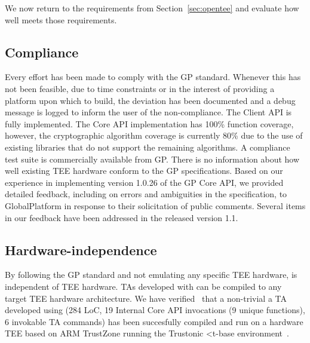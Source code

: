 \documentclass[10pt,conference,letterpaper]{IEEEtran}
\newcommand{\opentee}{\protect{TEE-Vi}\xspace}
\newcommand{\opentee}{\protect{Open-TEE}\xspace}
\begin{document}
We now return to the requirements from Section~\ref{sec:opentee} and evaluate how well \opentee meets those requirements.

\subsection{Compliance}

Every effort has been made to comply with the GP standard. Whenever this has not been feasible, due to time constraints or in the interest of providing a platform upon which to build, the deviation has been documented and a debug message is logged to inform the user of the non-compliance. The Client API is fully implemented. The Core API implementation has 100\% function coverage, however, the cryptographic algorithm coverage is currently 80\% due to the use of existing libraries that do not support the remaining algorithms.
A compliance test suite is commercially available from GP. There is no information about how well existing TEE hardware conform to the GP specifications. Based on our experience in implementing version 1.0.26 of the GP Core API, we provided detailed feedback, including on errors and ambiguities in the specification, to GlobalPlatform in response to their solicitation of public comments. Several items in our feedback have been addressed in the released version 1.1.


\subsection{Hardware-independence}

By following the GP standard and not emulating any specific TEE hardware, \opentee is independent of TEE hardware. TAs developed with \opentee can be compiled to any target TEE hardware architecture. We have verified~\cite{ekberg15} that a non-trivial a TA developed using \opentee (284 LoC, 19 Internal Core API invocations (9 unique functions), 6 invokable TA commands) has been succesfully compiled and run on a
hardware TEE based on ARM TrustZone running the Trustonic <t-base environment~\cite{web:trustonic_t_dev}.
\end{document}
